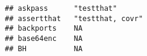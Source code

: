\documentclass[]{article}
\begin{document}
\begin{verbatim}
## askpass      "testthat"                                                                                                                                                                                                                                                                                                                                                                                                                                                                                                                                                                                
## assertthat   "testthat, covr"                                                                                                                                                                                                                                                                                                                                                                                                                                                                                                                                                                          
## backports    NA                                                                                                                                                                                                                                                                                                                                                                                                                                                                                                                                                                                        
## base64enc    NA                                                                                                                                                                                                                                                                                                                                                                                                                                                                                                                                                                                        
## BH           NA                                                                                                                                                                                                                                                                                                                                                                                                                                                                                                                                                                                        

\end{verbatim}
\end{document}
